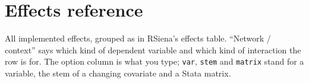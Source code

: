 \chapter{Effects reference}\label{app:effects}
All implemented effects, grouped as in RSiena's effects table. ``Network / context'' says which kind of dependent variable and which kind of interaction the row is for. The option column is what you type; \texttt{var}, \texttt{stem} and \texttt{matrix} stand for a variable, the stem of a changing covariate and a Stata matrix.

